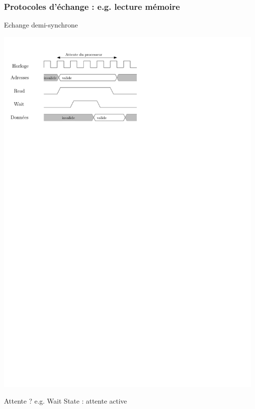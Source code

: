 \documentclass{beamer}
\begin{document}
\begin{frame}

\frametitle{Protocoles d'échange : e.g. lecture mémoire}

\begin{block}{Echange demi-synchrone}

\centering\includegraphics[width=0.7\linewidth]{Figs/sync_comm.pdf}

\end{block}

Attente ? e.g. Wait State : attente active

\end{frame}




\end{document}

